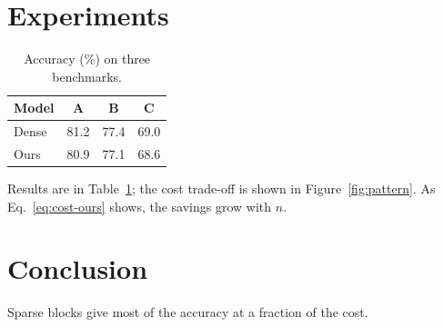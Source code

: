\documentclass[11pt]{article}
\begin{document}
\section{Experiments}
\begin{table}[h]
  \centering
  \caption{Accuracy (\%) on three benchmarks.}
  \label{tab:acc}
  \begin{tabular}{lccc}
    \toprule
    Model & A & B & C \\
    \midrule
    Dense & 81.2 & 77.4 & 69.0 \\
    Ours & 80.9 & 77.1 & 68.6 \\
    \bottomrule
  \end{tabular}
\end{table}
Results are in Table~\ref{tab:acc}; the cost trade-off is shown in Figure~\ref{fig:pattern}. As Eq.~\eqref{eq:cost-ours} shows, the savings grow with $n$.

\section{Conclusion}
Sparse blocks give most of the accuracy at a fraction of the cost.



\end{document}
